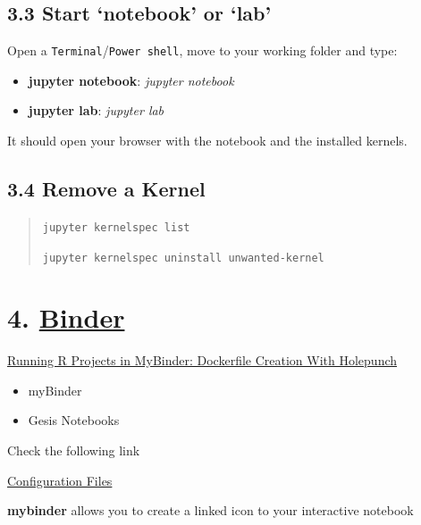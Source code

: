 \documentclass[
  12pt,
]{article}
\providecommand{\tightlist}{%
  \setlength{\itemsep}{0pt}\setlength{\parskip}{0pt}}
\begin{document}
\hypertarget{start-notebook-or-lab}{%
\subsection{3.3 Start `notebook' or `lab'}\label{start-notebook-or-lab}}

Open a \texttt{Terminal}/\texttt{Power\ shell}, move to your working
folder and type:

\begin{itemize}
\item
  \textbf{jupyter notebook}: \emph{jupyter notebook}
\item
  \textbf{jupyter lab}: \emph{jupyter lab}
\end{itemize}

It should open your browser with the notebook and the installed kernels.

\hypertarget{remove-a-kernel}{%
\subsection{3.4 Remove a Kernel}\label{remove-a-kernel}}

\begin{quote}
\texttt{jupyter\ kernelspec\ list}

\texttt{jupyter\ kernelspec\ uninstall\ unwanted-kernel}
\end{quote}

\hypertarget{binder}{%
\section{\texorpdfstring{4.
\href{https://jupyter.org/binder}{Binder}}{4. Binder}}\label{binder}}

\href{https://www.r-bloggers.com/running-r-projects-in-mybinder-dockerfile-creation-with-holepunch/}{Running
R Projects in MyBinder: Dockerfile Creation With Holepunch}

\begin{itemize}
\tightlist
\item
  myBinder
\item
  Gesis Notebooks
\end{itemize}

Check the following link

\href{https://mybinder.readthedocs.io/en/latest/using/config_files.html}{Configuration
Files}

\textbf{mybinder} allows you to create a linked icon to your interactive
notebook
\end{document}
